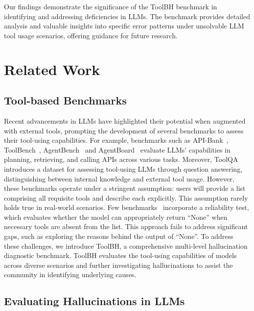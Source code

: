 \documentclass[11pt]{article}
\newcommand{\benchname}{ToolBH\xspace}
\begin{document}
Our findings demonstrate the significance of the \benchname benchmark in identifying and addressing deficiencies in LLMs. 
The benchmark provides detailed analysis and valuable insights into specific error patterns under unsolvable LLM tool usage scenarios, offering guidance for future research.

\section{Related Work}
\label{related-work}
\subsection{Tool-based Benchmarks}

Recent advancements in LLMs have highlighted their potential when augmented with external tools, prompting the development of several benchmarks to assess their tool-using capabilities.
For example, benchmarks such as API-Bank~\cite{DBLP:conf/emnlp/LiZ000YLHL23@apibank}, ToolBench~\cite{DBLP:journals/corr/abs-2307-16789@toolbench}, AgentBench~\cite{DBLP:journals/corr/abs-2308-03688@agentbench} and AgentBoard~\cite{DBLP:journals/corr/abs-2401-13178@agentboard} evaluate LLMs' capabilities in planning, retrieving, and calling APIs across various tasks.
Moreover, ToolQA~\cite{DBLP:conf/nips/ZhuangYWSZ23@toolqa} introduces a dataset for assessing tool-using LLMs through question answering, distinguishing between internal knowledge and external tool usage.
However, these benchmarks operate under a stringent assumption: users will provide a list comprising all requisite tools and describe each explicitly. 
This assumption rarely holds true in real-world scenarios. 
Few benchmarks~\cite{DBLP:journals/corr/abs-2310-03128@metatool} incorporate a reliability test, which evaluates whether the model can appropriately return ``None'' when necessary tools are absent from the list. 
This approach fails to address significant gaps, such as exploring the reasons behind the output of ``None''.
To address these challenges, we introduce \benchname, a comprehensive multi-level hallucination diagnostic benchmark. 
\benchname evaluates the tool-using capabilities of models across diverse scenarios and further investigating hallucinations to assist the community in identifying underlying causes.

\subsection{Evaluating Hallucinations in LLMs}
\end{document}
